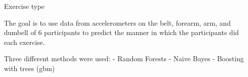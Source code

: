 \documentclass[11pt]{beamer}
\begin{document}
\begin{frame}{
	\begin{minipage}[t]{0.55\textwidth}
		Exercise type
	\end{minipage}
	\hfill
	\begin{minipage}[t]{0.35\textwidth}
		\flushright
	\end{minipage}
}{}
The goal is to use data from accelerometers on the belt, forearm, arm, and dumbell of 6 participants to predict the manner in which the participants did each exercise.  

\vspace{0.5cm}
Three different methods were used: - Random Forests - Naive Bayes - Boosting with trees (gbm)
\end{frame}
\end{document}
